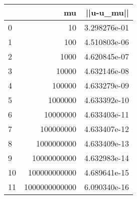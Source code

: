 \begin{tabular}{lrr}
\toprule
{} &             mu &    ||u-u\_mu|| \\
\midrule
0  &             10 &  3.298276e-01 \\
1  &            100 &  4.510803e-06 \\
2  &           1000 &  4.620845e-07 \\
3  &          10000 &  4.632146e-08 \\
4  &         100000 &  4.633279e-09 \\
5  &        1000000 &  4.633392e-10 \\
6  &       10000000 &  4.633403e-11 \\
7  &      100000000 &  4.633407e-12 \\
8  &     1000000000 &  4.633409e-13 \\
9  &    10000000000 &  4.632983e-14 \\
10 &   100000000000 &  4.689641e-15 \\
11 &  1000000000000 &  6.090340e-16 \\
\bottomrule
\end{tabular}
